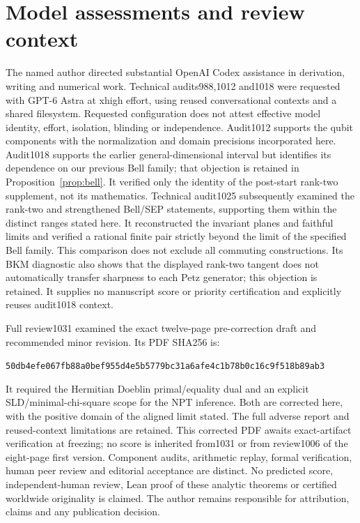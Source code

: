 \section{Model assessments and review context}\label{sec:assessment}
The named author directed substantial OpenAI Codex assistance in derivation, writing and numerical work. Technical audits988,1012 and1018 were requested with GPT-6 Astra at xhigh effort, using reused conversational contexts and a shared filesystem. Requested configuration does not attest effective model identity, effort, isolation, blinding or independence. Audit1012 supports the qubit components with the normalization and domain precisions incorporated here. Audit1018 supports the earlier general-dimensional interval but identifies its dependence on our previous Bell family; that objection is retained in Proposition~\ref{prop:bell}. It verified only the identity of the post-start rank-two supplement, not its mathematics. Technical audit1025 subsequently examined the rank-two and strengthened Bell/SEP statements, supporting them within the distinct ranges stated here. It reconstructed the invariant planes and faithful limits and verified a rational finite pair strictly beyond the limit of the specified Bell family. This comparison does not exclude all commuting constructions. Its BKM diagnostic also shows that the displayed rank-two tangent does not automatically transfer sharpness to each Petz generator; this objection is retained. It supplies no manuscript score or priority certification and explicitly reuses audit1018 context.

Full review1031 examined the exact twelve-page pre-correction draft and recommended minor revision. Its PDF SHA256 is:
\begin{center}\small\texttt{50db4efe067fb88a0bef955d4e5b5779bc31a6afe4c1b78b0c16c9f518b89ab3}\end{center}
 It required the Hermitian Doeblin primal/equality dual and an explicit SLD/minimal-chi-square scope for the NPT inference. Both are corrected here, with the positive domain of the aligned limit stated. The full adverse report and reused-context limitations are retained. This corrected PDF awaits exact-artifact verification at freezing; no score is inherited from1031 or from review1006 of the eight-page first version. Component audits, arithmetic replay, formal verification, human peer review and editorial acceptance are distinct. No predicted score, independent-human review, Lean proof of these analytic theorems or certified worldwide originality is claimed. The author remains responsible for attribution, claims and any publication decision.
